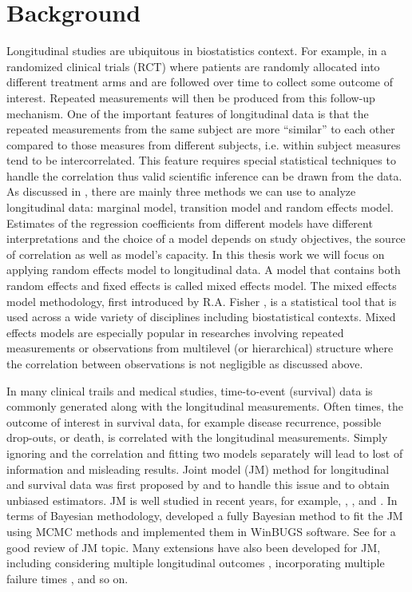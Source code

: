 \documentclass{article}
\begin{document}
\section{Background}
Longitudinal studies are ubiquitous in biostatistics context. For example, in a randomized clinical trials (RCT) where patients are randomly allocated into different treatment arms and are followed over time to collect some outcome of interest. Repeated measurements will then be produced from this follow-up mechanism. One of the important features of longitudinal data is that the repeated measurements from the same subject are more ``similar'' to each other compared to those measures from different subjects, i.e. within subject measures tend to be intercorrelated. This feature requires special statistical techniques to handle the correlation thus valid scientific inference can be drawn from the data. As discussed in \cite{diggle2002analysis}, there are mainly three methods we can use to analyze longitudinal data: marginal model, transition model and random effects model. Estimates of the regression coefficients from different models have different interpretations and the choice of a model depends on study objectives, the source of correlation as well as model's capacity. In this thesis work we will focus on applying random effects model to longitudinal data. A model that contains both random effects and fixed effects is called mixed effects model. The mixed effects model methodology, first introduced by R.A. Fisher \citep{fisher1919xv},  is a statistical tool that is used across a wide variety of disciplines including biostatistical contexts. Mixed effects models are especially popular in researches involving repeated measurements or observations from multilevel (or hierarchical) structure where the correlation between observations is not negligible as discussed above.\par

In many clinical trails and medical studies, time-to-event (survival) data is commonly generated along with the longitudinal measurements. Often times, the outcome of interest in survival data, for example disease recurrence, possible drop-outs, or death, is correlated with the longitudinal measurements. Simply ignoring and the correlation and fitting two models separately will lead to lost of information and misleading results. Joint model (JM) method for longitudinal and survival data was first proposed by \cite{tsiatis1995modeling} and \cite{faucett1996simultaneously} to handle this issue and to obtain unbiased estimators. JM is well studied in recent years, for example, \cite{henderson2000joint}, \cite{wang2001jointly}, and \cite{xu2001joint}. In terms of Bayesian methodology, \cite{guo2004separate} developed a fully Bayesian method to fit the JM using MCMC methods and implemented them in WinBUGS software. See \cite{yu2004joint} for a good review of JM topic. Many extensions have also been developed for JM, including considering multiple longitudinal outcomes \citep{brown2005flexible,rizopoulos2011bayesian}, incorporating multiple failure times \citep{elashoff2008joint}, and so on. \par
\end{document}
